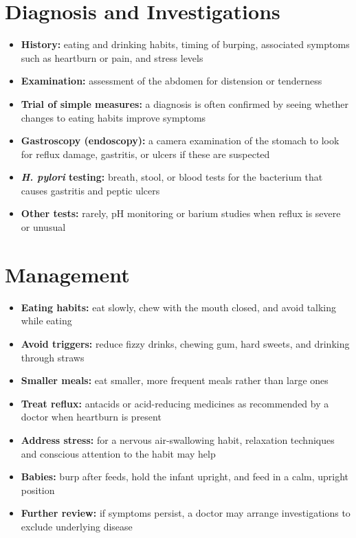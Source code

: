 \section*{Diagnosis and Investigations}
\begin{itemize}
    \item \textbf{History:} eating and drinking habits, timing of burping, associated symptoms such as heartburn or pain, and stress levels
    \item \textbf{Examination:} assessment of the abdomen for distension or tenderness
    \item \textbf{Trial of simple measures:} a diagnosis is often confirmed by seeing whether changes to eating habits improve symptoms
    \item \textbf{Gastroscopy (endoscopy):} a camera examination of the stomach to look for reflux damage, gastritis, or ulcers if these are suspected
    \item \textbf{\textit{H. pylori} testing:} breath, stool, or blood tests for the bacterium that causes gastritis and peptic ulcers
    \item \textbf{Other tests:} rarely, pH monitoring or barium studies when reflux is severe or unusual
\end{itemize}

\section*{Management}
\begin{itemize}
    \item \textbf{Eating habits:} eat slowly, chew with the mouth closed, and avoid talking while eating
    \item \textbf{Avoid triggers:} reduce fizzy drinks, chewing gum, hard sweets, and drinking through straws
    \item \textbf{Smaller meals:} eat smaller, more frequent meals rather than large ones
    \item \textbf{Treat reflux:} antacids or acid-reducing medicines as recommended by a doctor when heartburn is present
    \item \textbf{Address stress:} for a nervous air-swallowing habit, relaxation techniques and conscious attention to the habit may help
    \item \textbf{Babies:} burp after feeds, hold the infant upright, and feed in a calm, upright position
    \item \textbf{Further review:} if symptoms persist, a doctor may arrange investigations to exclude underlying disease
\end{itemize}

